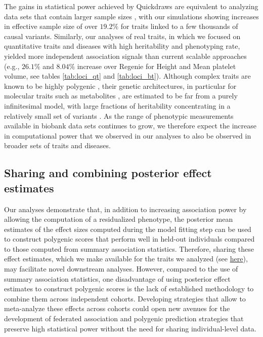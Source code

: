 The gains in statistical power achieved by Quickdraws are equivalent to analyzing data sets that contain larger sample sizes \cite{yang2011genomic,loh2015efficient,loh2018mixed}, with our simulations showing increases in effective sample size of over $19.2\%$ for traits linked to a few thousands of causal variants.
%
Similarly, our analyses of real traits, in which we focused on quantitative traits and diseases with high heritability and phenotyping rate, yielded more independent association signals than current scalable approaches (e.g., $26.1\%$ and $8.04\%$ increase over Regenie for Height and Mean platelet volume, see tables \ref{tab:loci_qt} and \ref{tab:loci_bt}).
%
Although complex traits are known to be highly polygenic \cite{yengo2022saturated}, their genetic architectures, in particular for molecular traits such as metabolites \cite{kettunen2012genome}, are estimated to be far from a purely infinitesimal model, with large fractions of heritability concentrating in a relatively small set of variants \cite{stahl2012bayesian,zeng2018signatures,weissbrod2020functionally}.
%
As the range of phenotypic measurements available in biobank data sets continues to grow, we therefore expect the increase in computational power that we observed in our analyses to also be observed in broader sets of traits and diseases.
%

\subsection{Sharing and combining posterior effect estimates}

Our analyses demonstrate that, in addition to increasing association power by allowing the computation of a residualized phenotype, the posterior mean estimates of the effect sizes computed during the model fitting step can be used to construct polygenic scores that perform well in held-out individuals compared to those computed from summary association statistics.
%
Therefore, sharing these effect estimates, which we make available for the traits we analyzed (see \href{https://www.stats.ox.ac.uk/publication-data/sge/ppg/quickdraws/}{here}), may facilitate novel downstream analyses.
%
However, compared to the use of summary association statistics, one disadvantage of using posterior effect estimates to construct polygenic scores is the lack of established methodology to combine them across independent cohorts.
%
Developing strategies that allow to meta-analyze these effects across cohorts could open new avenues for the development of federated association and polygenic prediction strategies that preserve high statistical power without the need for sharing individual-level data.
%

